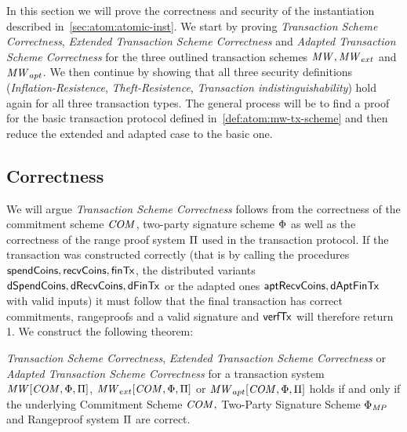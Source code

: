 In this section we will prove the correctness and security of the instantiation described in~\ref{sec:atom:atomic-inst}.
We start by proving \emph{Transaction Scheme Correctness}, \emph{Extended Transaction Scheme Correctness} and \emph{Adapted Transaction Scheme Correctness} for the three outlined transaction schemes $\mathit{MW}, \mathit{MW}_{ext}$ and $\mathit{MW}_{apt}$.
We then continue by showing that all three security definitions (\emph{Inflation-Resistence}, \emph{Theft-Resistence}, \emph{Transaction indistinguishability}) hold again for all three transaction types.
The general process will be to find a proof for the basic transaction protocol defined in~\ref{def:atom:mw-tx-scheme} and then reduce the extended and adapted case to the basic one.

\subsection{Correctness} \label{subsec:atom:correctness}

We will argue \emph{Transaction Scheme Correctness} follows from the correctness of the commitment scheme $\mathit{COM}$, two-party signature scheme $\Phi$ as well as the correctness of the range proof system $\Pi$ used in the transaction protocol.
If the transaction was constructed correctly (that is by calling the procedures $\mathsf{spendCoins}, \mathsf{recvCoins}, \mathsf{finTx}$, the distributed variants $\mathsf{dSpendCoins}, \mathsf{dRecvCoins}, \mathsf{dFinTx}$ or the adapted ones $\mathsf{aptRecvCoins}, \mathsf{dAptFinTx}$ with valid inputs) it must follow that the final transaction has correct commitments, rangeproofs and a valid signature and $\mathsf{verfTx}$ will therefore return 1.
We construct the following theorem:

\begin{theorem}\label{lem:atom:correctness}
    \emph{Transaction Scheme Correctness}, \emph{Extended Transaction Scheme Correctness} or \emph{Adapted Transaction Scheme Correctness} for a transaction system $\mathit{MW}[\mathit{COM},\Phi,\Pi]$, $\mathit{MW}_{ext}[\mathit{COM},\Phi,\Pi]$ or $\mathit{MW}_{apt}[\mathit{COM},\Phi,\Pi]$ holds if and only if the underlying Commitment Scheme $\mathit{COM},$ Two-Party Signature Scheme $\Phi_{\mathit{MP}}$ and Rangeproof system $\Pi$ are correct.
\end{theorem}

